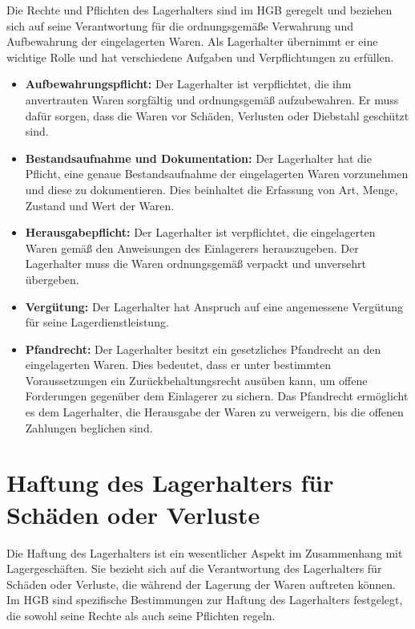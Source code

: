 Die Rechte und Pflichten des Lagerhalters sind im \ac{HGB} geregelt und beziehen sich auf seine Verantwortung für die ordnungsgemäße Verwahrung und Aufbewahrung der eingelagerten Waren. Als Lagerhalter übernimmt er eine wichtige Rolle und hat verschiedene Aufgaben und Verpflichtungen zu erfüllen.
\begin{itemize}
    \item \textbf{Aufbewahrungspflicht:} Der Lagerhalter ist verpflichtet, die ihm anvertrauten Waren sorgfältig und ordnungsgemäß aufzubewahren. Er muss dafür sorgen, dass die Waren vor Schäden, Verlusten oder Diebstahl geschützt sind.
    \item \textbf{Bestandsaufnahme und Dokumentation:} Der Lagerhalter hat die Pflicht, eine genaue Bestandsaufnahme der eingelagerten Waren vorzunehmen und diese zu dokumentieren. Dies beinhaltet die Erfassung von Art, Menge, Zustand und Wert der Waren.
    \item \textbf{Herausgabepflicht:} Der Lagerhalter ist verpflichtet, die eingelagerten Waren gemäß den Anweisungen des Einlagerers herauszugeben. Der Lagerhalter muss die Waren ordnungsgemäß verpackt und unversehrt übergeben.
    \item \textbf{Vergütung:} Der Lagerhalter hat Anspruch auf eine angemessene Vergütung für seine Lagerdienstleistung.
    \item \textbf{Pfandrecht:} Der Lagerhalter besitzt ein gesetzliches Pfandrecht an den eingelagerten Waren. Dies bedeutet, dass er unter bestimmten Voraussetzungen ein Zurückbehaltungsrecht ausüben kann, um offene Forderungen gegenüber dem Einlagerer zu sichern. Das Pfandrecht ermöglicht es dem Lagerhalter, die Herausgabe der Waren zu verweigern, bis die offenen Zahlungen beglichen sind.
\end{itemize}

\section{Haftung des Lagerhalters für Schäden oder Verluste}
Die Haftung des Lagerhalters ist ein wesentlicher Aspekt im Zusammenhang mit Lagergeschäften. Sie bezieht sich auf die Verantwortung des Lagerhalters für Schäden oder Verluste, die während der Lagerung der Waren auftreten können. Im \ac{HGB} sind spezifische Bestimmungen zur Haftung des Lagerhalters festgelegt, die sowohl seine Rechte als auch seine Pflichten regeln.

